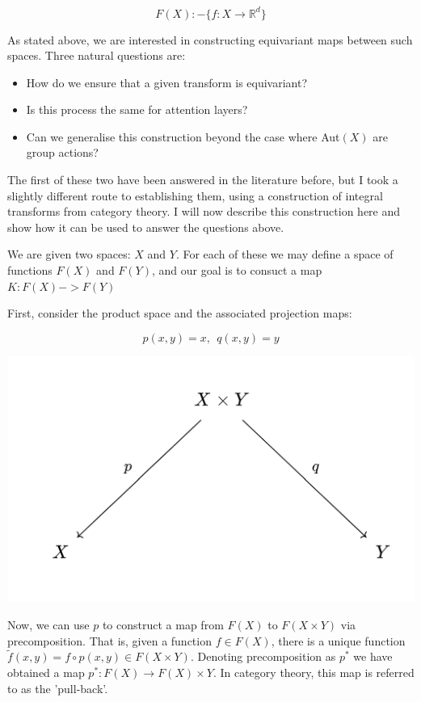 \documentclass[11pt]{article}
\begin{document}
$$ F(X) :- \{ f: X \rightarrow \mathbb{R}^d \}$$

As stated above, we are interested in constructing equivariant maps between such spaces. Three natural questions are:

\begin{itemize}
    \item How do we ensure that a given transform is equivariant?
    \item Is this process the same for attention layers? 
    \item Can we generalise this construction beyond the case where Aut$(X)$ are group actions?
\end{itemize}

The first of these two have been answered in the literature before, but I took a slightly different route to establishing them, using a construction of integral transforms from category theory. I will now describe this construction here and show how it can be used to answer the questions above. %

We are given two spaces: $X$ and $Y$. For each of these we may define a space of functions $F(X)$ and $F(Y)$, and our goal is to consuct a map $K: F(X) -> F(Y)$

First, consider the product space and the associated projection maps:

$$ p(x, y) = x, \ \  q(x, y) = y$$

\pagebreak

\includegraphics[scale=0.4]{basic_span.png}

Now, we can use $p$ to construct a map from $F(X)$ to $F(X\times Y)$ via precomposition. That is, given a function $f \in F(X)$, there is a unique function $\tilde{f}(x,y) = f \circ p (x, y)  \in F(X \times Y)$. Denoting precomposition as $p^*$ we have obtained a map $p^*: F(X) \rightarrow F(X) \times Y$. In category theory, this map is referred to as the 'pull-back'.
\end{document}
